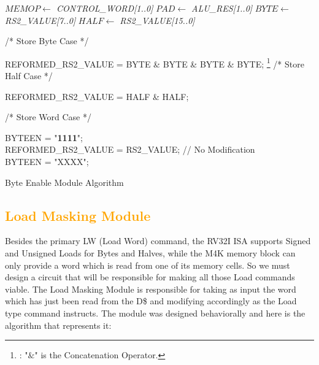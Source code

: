 \begin{algorithm}[H]
	\SetAlgoLined
	
	\BlankLine
	\BlankLine
	
	\emph{$MEMOP \leftarrow $ CONTROL\_WORD[1..0]}\;
	\emph{$PAD \leftarrow $ ALU\_RES[1..0]}\; 
	\emph{$BYTE \leftarrow $ RS2\_VALUE[7..0]}\;
	\emph{$HALF \leftarrow $ RS2\_VALUE[15..0]}\;
	
	\BlankLine
	/* Store Byte Case */ \\
	\BlankLine
	
	{
		\BlankLine
		\BlankLine
	    REFORMED\_RS2\_VALUE = BYTE \& BYTE \& BYTE \& BYTE; \footnote{: "$\&$" is the Concatenation Operator.}
	}
	\BlankLine
	/* Store Half Case */ \\
	\BlankLine
	
	{
	
		\BlankLine
		\BlankLine
		REFORMED\_RS2\_VALUE = HALF \& HALF; 
	}
	\BlankLine
	/* Store Word Case */ \\
	\BlankLine
	
	{	
		BYTEEN = "\textbf{1111}"; \\
		REFORMED\_RS2\_VALUE = RS2\_VALUE; // No Modification\\
	}
	\uElse
	{
		BYTEEN = "XXXX"; 
	}
	
	
	\caption{Byte Enable Module Algorithm}
	\label{Algorithm3}
\end{algorithm}	
\vspace{2mm}


\subsection{\textcolor{orange}{Load Masking Module}}
\label{SubSec3.4.3:LMASK}

Besides the primary LW (Load Word) command, the RV32I ISA supports Signed and Unsigned Loads for Bytes and Halves, while the M4K memory block can only provide a word which is read from one of its memory cells. So we must design a circuit that will be responsible for making all those Load commands viable. The Load Masking Module is responsible for taking as input the word which has just been read from the D\$ and modifying accordingly as the Load type command instructs. The module was designed behaviorally and here is the algorithm that represents it:\\


